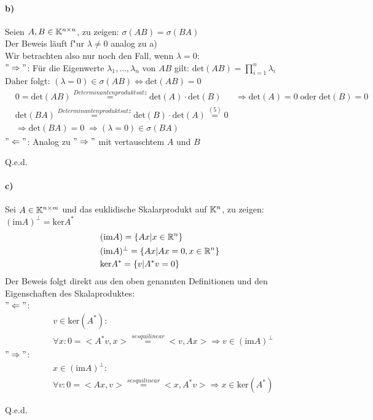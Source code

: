 \paragraph*{b)}
Seien $A,B \in \mathbb K^{n\times n}$, zu zeigen: $\sigma(AB) = \sigma(BA)$\\
\newline
Der Beweis l\"auft f"ur $\lambda \neq 0$ analog zu a)\\
Wir betrachten also nur noch den Fall, wenn $\lambda = 0$:\\
\newline
$"\Rightarrow"$:
F\"ur die Eigenwerte $\lambda_1, \dots,\lambda_n$ von $AB$ gilt: $\mathrm{det}(AB)=\prod_{i=1}^{n}\lambda_i$\\
Daher folgt: $(\lambda = 0) \in \sigma(AB)\Leftrightarrow \mathrm{det}(AB)=0$\\
\begin{align}
&0=\mathrm{det}(AB)\overset{Determinantenproduktsatz}{=}\mathrm{det}(A)\cdot \mathrm{det}(B)
&\Rightarrow \mathrm{det}(A)=0\; \mathrm{oder}\; \mathrm{det}(B)=0\\
&\mathrm{det}(BA)\overset{Determinantenproduktsatz}{=}\mathrm{det}(B)\cdot \mathrm{det}(A)\overset{(5)}{=}0\\
&\Rightarrow \mathrm{det}(BA)=0 \;\Rightarrow (\lambda = 0) \in \sigma(BA)
\end{align}
$"\Leftarrow"$: Analog zu $"\Rightarrow"$ mit vertauschtem $A$ und $B$\begin{flushright}Q.e.d.\end{flushright}

\paragraph*{c)}
Sei $A \in \mathbb K^{n\times m}$ und das euklidische Skalarprodukt auf $\mathbb K^n$, zu zeigen: $(\mathrm{im} A)^\perp = \mathrm{ker} A^*$\\
\begin{align}
&(\mathrm{im} A) = \{Ax|x \in \mathbb R^n\}\\
&(\mathrm{im} A)^\perp = \{Ax|Ax=0,x \in \mathbb R^n\}\\
&\mathrm{ker} A^*=\{v| A^*v=0\}
\end{align}
Der Beweis folgt direkt aus den oben genannten Definitionen und den Eigenschaften des Skalaproduktes:\\
\newline
$"\Leftarrow"$:
\begin{align}
&v \in \mathrm{ker}(A^*):\\
&\forall x: 0 = <A^*v,x>\overset{sesquilinear}{=} <v, Ax> \Rightarrow v \in (\mathrm{im} A)^\perp
\end{align}
$"\Rightarrow"$:
\begin{align}
&x \in (\mathrm{im} A)^\perp:\\
&\forall v:0=<Ax,v> \overset{sesquilinear}{=} <x, A^*v> \Rightarrow x \in \mathrm{ker}(A^*)
\end{align}
\begin{flushright}Q.e.d.\end{flushright}


